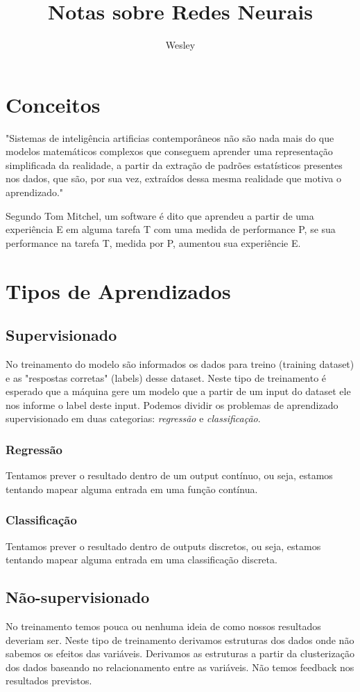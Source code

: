 \documentclass[11pt,a4paper,leqno]{article}
\author{Wesley}
\title{Notas sobre Redes Neurais}
\begin{document}
\section{Conceitos}
"Sistemas de inteligência artificias contemporâneos não são nada mais do que modelos matemáticos complexos que conseguem aprender uma representação simplificada da realidade, a partir da extração de padrões estatísticos presentes nos dados, que são, por sua vez, extraídos dessa mesma realidade que motiva o aprendizado."

Segundo Tom Mitchel, um software é dito que aprendeu a partir de uma experiência E em alguma tarefa T com uma medida de performance P, se sua performance na tarefa T, medida por P, aumentou sua experiêncie E.

\section{Tipos de Aprendizados}
\subsection{Supervisionado}
No treinamento do modelo são informados os dados para treino (training dataset) e as "respostas corretas" (labels) desse dataset. Neste tipo de treinamento é esperado que a máquina gere um modelo que a partir de um input do dataset ele nos informe o label deste input.
Podemos dividir os problemas de aprendizado supervisionado em duas categorias: \emph{regressão} e \emph{classificação}.

\subsubsection{Regressão}
Tentamos prever o resultado dentro de um output contínuo, ou seja, estamos tentando mapear alguma entrada em uma função contínua.

\subsubsection{Classificação}
Tentamos prever o resultado dentro de outputs discretos, ou seja, estamos tentando mapear alguma entrada em uma classificação discreta.


\subsection{Não-supervisionado}
No treinamento temos pouca ou nenhuma ideia de como nossos resultados deveriam ser. Neste tipo de treinamento derivamos estruturas dos dados onde não sabemos os efeitos das variáveis.
Derivamos as estruturas a partir da clusterização dos dados baseando no relacionamento entre as variáveis.
Não temos feedback nos resultados previstos.
\end{document}
